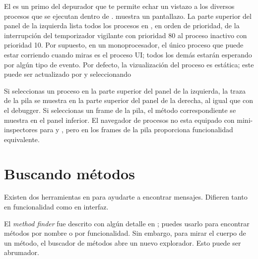 \documentclass[spanish,a4paper,10pt,twoside]{book}
\begin{document}
El  es un primo del depurador que te permite echar un vistazo a los diversos procesos que se ejecutan dentro de \pharo.
 muestra un pantallazo.
La parte superior del panel de la izquierda lista todos los procesos en \pharo, en orden de prioridad, de la interrupci\'on del temporizador vigilante con prioridad 80 al proceso inactivo con prioridad 10.
Por supuesto, en un monoprocesador, el \'unico proceso que puede estar corriendo
cuando miras es el proceso UI; todos los dem\'as estar\'an esperando por alg\'un tipo de evento.
Por defecto, la vizualizaci\'on del proceso es est\'atica; este puede ser actualizado por  y seleccionando 

Si seleccionas un proceso en la parte superior del panel de la izquierda, la
traza de la pila se muestra en la parte superior del panel de la derecha, al
igual que con el debugger. Si seleccionas un frame de la pila, el m\'etodo
correspondiente se muestra en el panel inferior. El navegador de procesos no esta equipado con mini-inspectores para \self y , pero  en los frames de la pila proporciona funcionalidad equivalente.

\section{Buscando m\'etodos}

Existen dos herramientas en \pharo para ayudarte a encontrar mensajes.
Difieren tanto en funcionalidad como en interfaz.

El \emph{method finder} fue descrito con alg\'un detalle en ; puedes usarlo para encontrar m\'etodos por nombre o por funcionalidad.
Sin embargo, para mirar el cuerpo de un m\'etodo, el buscador de m\'etodos abre un nuevo explorador.
Esto puede ser abrumador.
\end{document}
